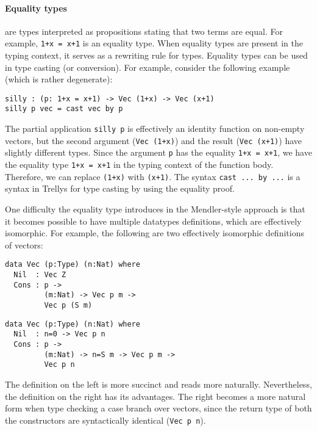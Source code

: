 \documentclass[letterpaper,12pt]{article}
\begin{document}
\paragraph{Equality types} are types interpreted as propositions stating
that two terms are equal.  For example, \verb|1+x = x+1| is an equality type.
When equality types are present in the typing context,
it serves as a rewriting rule for types.
Equality types can be used in type casting (or conversion).
For example, consider the following example (which is rather degenerate):
\begin{verbatim}
silly : (p: 1+x = x+1) -> Vec (1+x) -> Vec (x+1)
silly p vec = cast vec by p
\end{verbatim}
The partial application \verb|silly p| is effectively
an identity function on non-empty vectors, but the
second argument (\verb|Vec (1+x)|) and the result (\verb|Vec (x+1)|)
have slightly different types.  Since the argument \verb|p| has
the equality \verb|1+x = x+1|, we have the equality type \verb|1+x = x+1|
in the typing context of the function body.
Therefore, we can replace \verb|(1+x)| with \verb|(x+1)|.
The syntax \verb|cast ... by ...| is a syntax in Trellys
for type casting by using the equality proof.

One difficulty the equality type introduces in the Mendler-style approach
is that it becomes possible to have multiple datatypes definitions, which are
effectively isomorphic. For example, the following are
two effectively isomorphic definitions of vectors:
\begin{center}
\begin{minipage}{.49\linewidth}
\begin{verbatim}
data Vec (p:Type) (n:Nat) where
  Nil  : Vec Z
  Cons : p ->
         (m:Nat) -> Vec p m ->
         Vec p (S m)
\end{verbatim}
\end{minipage}
\begin{minipage}{.49\linewidth}
\begin{verbatim}
data Vec (p:Type) (n:Nat) where
  Nil  : n=0 -> Vec p n
  Cons : p ->
         (m:Nat) -> n=S m -> Vec p m ->
         Vec p n
\end{verbatim}
\end{minipage}
\end{center}
The definition on the left is more succinct and reads more naturally.
Nevertheless, the definition on the right has its advantages.
The right becomes a more natural form when type checking a case branch
over vectors, since the return type of both the constructors are syntactically
identical (\verb|Vec p n|).
\end{document}
